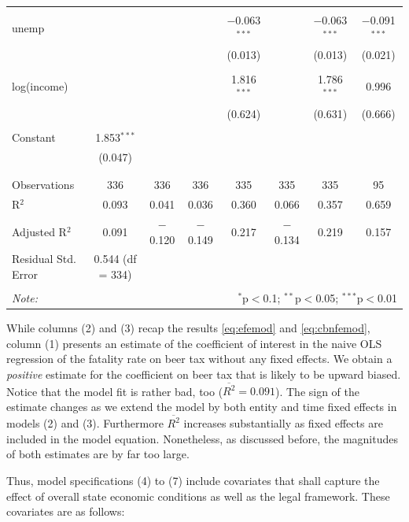 \documentclass[]{book}
\theoremstyle{definition}
\theoremstyle{definition}
\theoremstyle{definition}
\theoremstyle{remark}
\begin{document}
\begin{table}
\begin{tabular}{@{\extracolsep{-5pt}}lccccccc}
  & & & & & & & \\ 
 unemp &  &  &  & $-$0.063$^{***}$ &  & $-$0.063$^{***}$ & $-$0.091$^{***}$ \\ 
  &  &  &  & (0.013) &  & (0.013) & (0.021) \\ 
  & & & & & & & \\ 
 log(income) &  &  &  & 1.816$^{***}$ &  & 1.786$^{***}$ & 0.996 \\ 
  &  &  &  & (0.624) &  & (0.631) & (0.666) \\ 
  & & & & & & & \\ 
 Constant & 1.853$^{***}$ &  &  &  &  &  &  \\ 
  & (0.047) &  &  &  &  &  &  \\ 
  & & & & & & & \\ 
\hline \\[-1.8ex] 
Observations & 336 & 336 & 336 & 335 & 335 & 335 & 95 \\ 
R$^{2}$ & 0.093 & 0.041 & 0.036 & 0.360 & 0.066 & 0.357 & 0.659 \\ 
Adjusted R$^{2}$ & 0.091 & $-$0.120 & $-$0.149 & 0.217 & $-$0.134 & 0.219 & 0.157 \\ 
Residual Std. Error & 0.544 (df = 334) &  &  &  &  &  &  \\ 
\hline 
\hline \\[-1.8ex] 
\textit{Note:}  & \multicolumn{7}{r}{$^{*}$p$<$0.1; $^{**}$p$<$0.05; $^{***}$p$<$0.01} \\ 
\end{tabular} 
\end{table}

While columns (2) and (3) recap the results \eqref{eq:efemod} and
\eqref{eq:cbnfemod}, column (1) presents an estimate of the coefficient of
interest in the naive OLS regression of the fatality rate on beer tax
without any fixed effects. We obtain a \emph{positive} estimate for the
coefficient on beer tax that is likely to be upward biased. Notice that
the model fit is rather bad, too (\(\overline{R^2} = 0.091\)). The sign
of the estimate changes as we extend the model by both entity and time
fixed effects in models (2) and (3). Furthermore \(\overline{R^2}\)
increases substantially as fixed effects are included in the model
equation. Nonetheless, as discussed before, the magnitudes of both
estimates are by far too large.

Thus, model specifications (4) to (7) include covariates that shall
capture the effect of overall state economic conditions as well as the
legal framework. These covariates are as follows:
\end{document}
